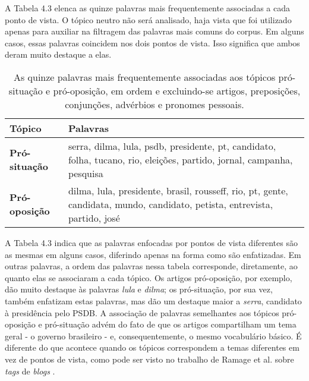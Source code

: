 
A Tabela 4.3 elenca as quinze palavras mais frequentemente associadas a cada ponto de vista. O tópico neutro não será analisado, haja vista que foi utilizado apenas para auxiliar na filtragem das palavras mais comuns do corpus. Em alguns casos, essas palavras coincidem nos dois pontos de vista. Isso significa que ambos deram muito destaque a elas.



\begin{table}[h]
\centering
\begin{tabular}{| l | p{10cm} | }
\hline
\textbf{Tópico} & \textbf{Palavras} \\ \hline
\textbf{Pró-situação} & serra, dilma, lula, psdb, presidente, pt, candidato, folha, tucano, rio, eleições, partido, jornal, campanha, pesquisa \\ \hline
\textbf{Pró-oposição} & dilma, lula, presidente, brasil, rousseff, rio, pt, gente, candidata, mundo, candidato, petista, entrevista, partido, josé \\ \hline
\end{tabular}
\label{tab:palavras}
\caption{As quinze palavras mais frequentemente associadas aos tópicos pró-situação e pró-oposição, em ordem e excluindo-se artigos, preposições, conjunções, advérbios e pronomes pessoais.}
\end{table}


A Tabela 4.3 indica que as palavras enfocadas por pontos de vista diferentes são as mesmas em alguns casos, diferindo apenas na forma como são enfatizadas. Em outras palavras, a ordem das palavras nessa tabela corresponde, diretamente, ao quanto elas se associaram a cada tópico. Os artigos pró-oposição, por exemplo, dão muito destaque às palavras \emph{lula} e \emph{dilma}; os pró-situação, por sua vez, também enfatizam estas palavras, mas dão um destaque maior a \emph{serra}, candidato à presidência pelo PSDB. A associação de palavras semelhantes aos tópicos pró-oposição e pró-situação advém do fato de que os artigos compartilham um tema geral - o governo brasileiro - e, consequentemente, o mesmo vocabulário básico. É diferente do que acontece quando os tópicos correspondem a temas diferentes em vez de pontos de vista, como pode ser visto no trabalho de Ramage et al. sobre \emph{tags} de \emph{blogs} \cite{llda}.

